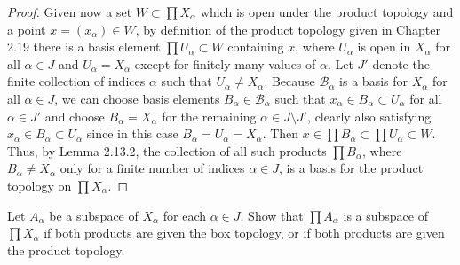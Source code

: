 \begin{solution}
\begin{proof}
        Given now a set $W \subset \prod X_\alpha$ which is open under the product topology and a point $x = (x_\alpha) \in W$, by definition of the product topology given in Chapter 2.19 there is a basis element $\prod U_\alpha \subset W$ containing $x$, where $U_\alpha$ is open in $X_\alpha$ for all $\alpha \in J$ and $U_\alpha = X_\alpha$ except for finitely many values of $\alpha$.
        Let $J'$ denote the finite collection of indices $\alpha$ such that $U_\alpha \neq X_\alpha$.
        Because $\mathscr{B}_\alpha$ is a basis for $X_\alpha$ for all $\alpha \in J$, we can choose basis elements $B_\alpha \in \mathscr{B}_\alpha$ such that $x_\alpha \in B_\alpha \subset U_\alpha$ for all $\alpha \in J'$ and choose $B_\alpha = X_\alpha$ for the remaining $\alpha \in J \setminus J'$, clearly also satisfying $x_\alpha \in B_\alpha \subset U_\alpha$ since in this case $B_\alpha = U_\alpha = X_\alpha$.
        Then $x \in \prod B_\alpha \subset \prod U_\alpha \subset W$.
        Thus, by Lemma 2.13.2, the collection of all such products $\prod B_\alpha$, where $B_\alpha \neq X_\alpha$ only for a finite number of indices $\alpha \in J$, is a basis for the product topology on $\prod X_\alpha$.
    \end{proof}
\end{solution}
\newpage

\begin{exercise}[ID=2.19.2]
    Let $A_\alpha$ be a subspace of $X_\alpha$ for each $\alpha \in J$.
    Show that $\prod A_\alpha$ is a subspace of $\prod X_\alpha$ if both products are given the box topology, or if both products are given the product topology.
\end{exercise}

